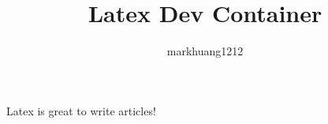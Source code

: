 \documentclass[12pt, a4paper]{article}
\author{markhuang1212}
\title{Latex Dev Container}
\begin{document}
\maketitle

Latex is great to write articles! \cite{mittelbach2004latex}



\end{document}
